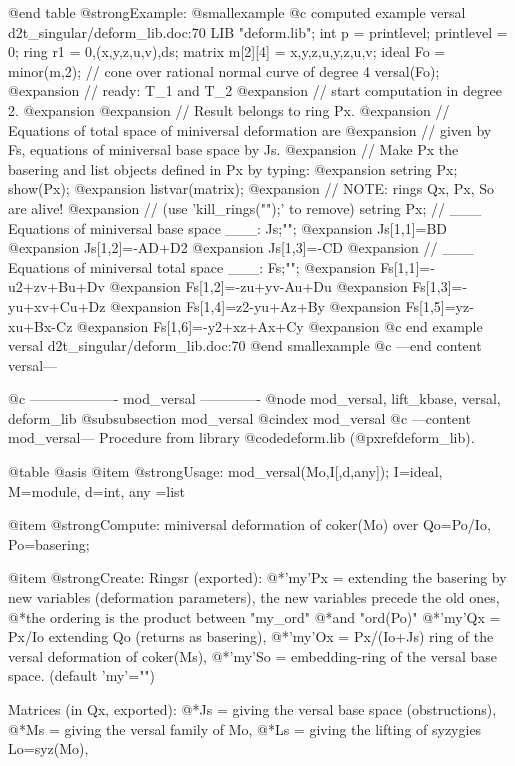 @end table
@strong{Example:}
@smallexample
@c computed example versal d2t_singular/deform_lib.doc:70 
LIB "deform.lib";
int p          = printlevel;
printlevel     = 0;
ring r1        = 0,(x,y,z,u,v),ds;
matrix m[2][4] = x,y,z,u,y,z,u,v;
ideal Fo       = minor(m,2);
// cone over rational normal curve of degree 4
versal(Fo);
@expansion{} // ready: T_1 and T_2
@expansion{} // start computation in degree 2.
@expansion{} 
@expansion{} // Result belongs to ring Px.
@expansion{} // Equations of total space of miniversal deformation are 
@expansion{} // given by Fs, equations of miniversal base space by Js.
@expansion{} // Make Px the basering and list objects defined in Px by typing:
@expansion{}    setring Px; show(Px);
@expansion{}    listvar(matrix);
@expansion{} // NOTE: rings Qx, Px, So are alive!
@expansion{} // (use 'kill_rings("");' to remove)
setring Px;
// ___ Equations of miniversal base space ___:
Js;"";
@expansion{} Js[1,1]=BD
@expansion{} Js[1,2]=-AD+D2
@expansion{} Js[1,3]=-CD
@expansion{} 
// ___ Equations of miniversal total space ___:
Fs;"";
@expansion{} Fs[1,1]=-u2+zv+Bu+Dv
@expansion{} Fs[1,2]=-zu+yv-Au+Du
@expansion{} Fs[1,3]=-yu+xv+Cu+Dz
@expansion{} Fs[1,4]=z2-yu+Az+By
@expansion{} Fs[1,5]=yz-xu+Bx-Cz
@expansion{} Fs[1,6]=-y2+xz+Ax+Cy
@expansion{} 
@c end example versal d2t_singular/deform_lib.doc:70
@end smallexample
@c ---end content versal---

@c ------------------- mod_versal -------------
@node mod_versal, lift_kbase, versal, deform_lib
@subsubsection mod_versal
@cindex mod_versal
@c ---content mod_versal---
Procedure from library @code{deform.lib} (@pxref{deform_lib}).

@table @asis
@item @strong{Usage:}
mod_versal(Mo,I[,d,any]); I=ideal, M=module, d=int, any =list

@item @strong{Compute:}
miniversal deformation of coker(Mo) over Qo=Po/Io, Po=basering;

@item @strong{Create:}
Ringsr (exported):
@*'my'Px = extending the basering by new variables (deformation
parameters), the new variables precede the old ones,
@*the ordering is the product between "my_ord"
@*and "ord(Po)"
@*'my'Qx = Px/Io extending Qo (returns as basering),
@*'my'Ox = Px/(Io+Js) ring of the versal deformation of coker(Ms),
@*'my'So = embedding-ring of the versal base space. (default 'my'="")

Matrices (in Qx, exported):
@*Js = giving the versal base space (obstructions),
@*Ms = giving the versal family of Mo,
@*Ls = giving the lifting of syzygies Lo=syz(Mo),

